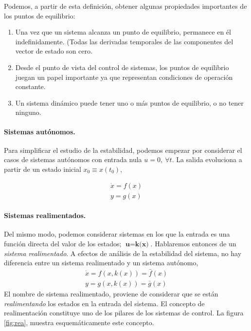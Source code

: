 Podemos, a partir de esta definición, obtener algunas propiedades importantes de los puntos de equilibrio:
\begin{enumerate}
\item Una vez que un sistema alcanza un punto de equilibrio, permanece en él indefinidamente. (Todas las derivadas temporales de las componentes del vector de estado son cero.
\item Desde el punto de vista del control de sistemas, los puntos de equilibrio juegan un papel importante ya que representan condiciones de operación constante.
\item Un sistema dinámico puede tener uno o más puntos de equilibrio, o no tener ninguno. 
\end{enumerate}

\paragraph{Sistemas autónomos.} Para simplificar el estudio de la estabilidad, podemos empezar por considerar el casos de sistemas autónomos con entrada nula  $u = 0, \ \forall t$. La salida evoluciona a partir de un estado inicial $x_0\equiv x(t_0)$,

\begin{align}
\dot{x} = f(x)\\
y = g(x)
\end{align}

\paragraph{Sistemas realimentados.} Del mismo modo, podemos considerar sistemas en los que la entrada es una función directa del valor de los estados; $\textbf{u}= \textbf{k(x)}$. Hablaremos entonces de un \emph{sistema realimentado}. A efectos de análisis de la estabilidad del sistema, no hay diferencia entre un sistema realimentado y un sistema autónomo,
\begin{align}
\dot{x} = f(x,k(x)) = \bar{f}(x)\\
y = g(x,k(x)) = \bar{g}(x)
\end{align}
El nombre de sistema realimentado, proviene de considerar que se están \emph{realimentando} los estados en la entrada del sistema. El concepto de realimentación constituye uno de los pilares de los sistemas de control. La figura \ref{fig:rea}, muestra esquemáticamente este concepto.

